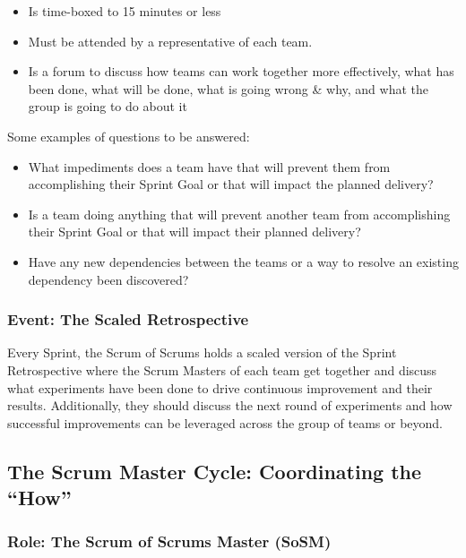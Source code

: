 \documentclass[12pt,a4paper,parskip=full]{scrartcl}
\begin{document}
\begin{itemize}
\itemsep1pt\parskip0pt
\item
  Is time-boxed to 15 minutes or less
\item
  Must be attended by a representative of each team.
\item
  Is a forum to discuss how teams can work together more effectively,
  what has been done, what will be done, what is going wrong \& why, and
  what the group is going to do about it
\end{itemize}

Some examples of questions to be answered:

\begin{itemize}
\itemsep1pt\parskip0pt
\item
  What impediments does a team have that will prevent them from accomplishing their Sprint Goal or that will impact the planned delivery?
\item
  Is a team doing anything that will prevent another team from accomplishing their Sprint Goal or that will impact their planned delivery?
\item
 Have any new dependencies between the teams or a way to resolve an existing dependency been discovered?
\end{itemize}

\subsubsection{Event: The Scaled
Retrospective}\label{event-the-scaled-retrospective}

Every Sprint, the Scrum of Scrums holds a scaled version of the Sprint Retrospective where the Scrum Masters of each team get together and discuss what experiments have been done to drive continuous improvement and their results. Additionally, they should discuss the next round of experiments and how successful improvements can be leveraged across the group of teams or beyond.

\subsection{The Scrum Master Cycle: Coordinating the
``How''}\label{the-scrum-master-cycle}

\subsubsection{Role: The Scrum of Scrums Master
(SoSM)}\label{role-the-scrum-of-scrums-master}
\end{document}
